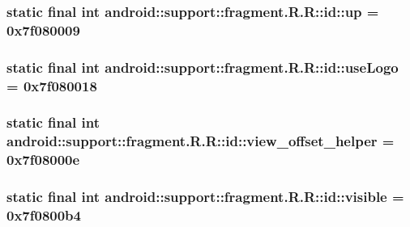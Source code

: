 \hypertarget{classandroid_1_1support_1_1fragment_1_1_r_1_1id_787a85042a0973974dbd969b0f3401f8}{
\subsubsection[{up}]{\setlength{\rightskip}{0pt plus 5cm}static final int android::support::fragment.R.R::id::up = 0x7f080009}}
\label{classandroid_1_1support_1_1fragment_1_1_r_1_1id_787a85042a0973974dbd969b0f3401f8}


\hypertarget{classandroid_1_1support_1_1fragment_1_1_r_1_1id_caf764487d62087688367bd7e192b87d}{
\subsubsection[{useLogo}]{\setlength{\rightskip}{0pt plus 5cm}static final int android::support::fragment.R.R::id::useLogo = 0x7f080018}}
\label{classandroid_1_1support_1_1fragment_1_1_r_1_1id_caf764487d62087688367bd7e192b87d}


\hypertarget{classandroid_1_1support_1_1fragment_1_1_r_1_1id_47be60f0eeb78e78ea29be9f899d1498}{
\subsubsection[{view\_\-offset\_\-helper}]{\setlength{\rightskip}{0pt plus 5cm}static final int android::support::fragment.R.R::id::view\_\-offset\_\-helper = 0x7f08000e}}
\label{classandroid_1_1support_1_1fragment_1_1_r_1_1id_47be60f0eeb78e78ea29be9f899d1498}


\hypertarget{classandroid_1_1support_1_1fragment_1_1_r_1_1id_90f05b01648a2b27fbe9ef8eca771162}{
\subsubsection[{visible}]{\setlength{\rightskip}{0pt plus 5cm}static final int android::support::fragment.R.R::id::visible = 0x7f0800b4}}
\label{classandroid_1_1support_1_1fragment_1_1_r_1_1id_90f05b01648a2b27fbe9ef8eca771162}


